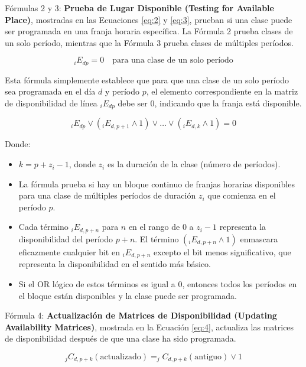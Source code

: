 Fórmulas 2 y 3: \textbf{Prueba de Lugar Disponible (Testing for Available Place)}, mostradas en las Ecuaciones \ref{eq:2} y \ref{eq:3}, prueban si una clase puede ser programada en una franja horaria específica.
La Fórmula 2 prueba clases de un solo período, mientras que la Fórmula 3 prueba clases de múltiples períodos.

\begin{equation}
\label{eq:2}
_iE_{dp} = 0 \quad \text{para una clase de un solo período}
\end{equation}

Esta fórmula simplemente establece que para que una clase de un solo período sea programada en el día \( d \) y período \( p \), el elemento correspondiente en la matriz de disponibilidad de línea \( _iE_{dp} \) debe ser 0, indicando que la franja está disponible.

\begin{equation}
\label{eq:3}
_iE_{dp} \vee (_iE_{d,p+1} \wedge 1) \vee \dots \vee (_iE_{d,k} \wedge 1) = 0
\end{equation}

Donde:
\begin{itemize}
    \item \( k = p + z_i - 1 \), donde \( z_i \) es la duración de la clase (número de períodos).
    \item La fórmula prueba si hay un bloque continuo de franjas horarias disponibles para una clase de múltiples períodos de duración \( z_i \) que comienza en el período \( p \).
    \item Cada término \( _iE_{d,p+n} \) para \( n \) en el rango de \( 0 \) a \( z_i-1 \) representa la disponibilidad del período \( p+n \).
    El término \( (_iE_{d,p+n} \wedge 1) \) enmascara eficazmente cualquier bit en \( _iE_{d,p+n} \) excepto el bit menos significativo, que representa la disponibilidad en el sentido más básico.
    \item Si el OR lógico de estos términos es igual a 0, entonces todos los períodos en el bloque están disponibles y la clase puede ser programada.
\end{itemize}

Fórmula 4: \textbf{Actualización de Matrices de Disponibilidad (Updating Availability Matrices)}, mostrada en la Ecuación \ref{eq:4}, actualiza las matrices de disponibilidad después de que una clase ha sido programada.

\begin{equation}
\label{eq:4}
_jC_{d, p+k} (\text{actualizado}) = _jC_{d, p+k} (\text{antiguo}) \vee 1
\end{equation}

